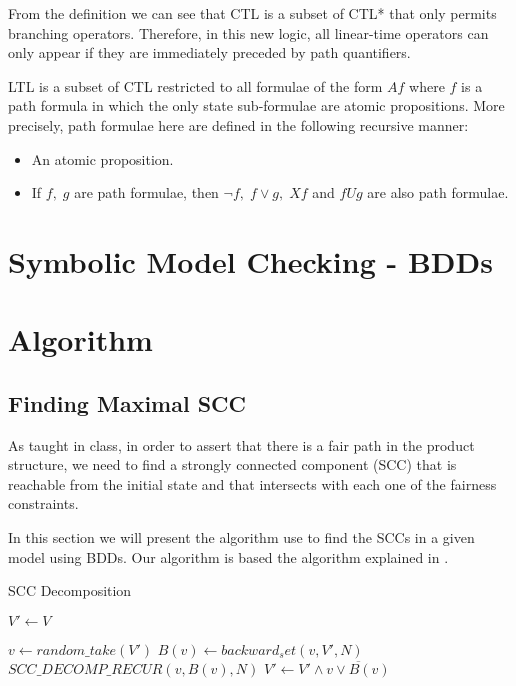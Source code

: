 \documentclass[11pt]{article}
\begin{document}
    From the definition we can see that CTL is a subset of CTL* that only permits
    branching operators. Therefore, in this new logic, all linear-time operators
    can only appear if they are immediately preceded by path quantifiers.

    \begin{definition}
        LTL is a subset of CTL restricted to all formulae of the form $Af$ where
        $f$ is a path formula in which the only state sub-formulae are atomic
        propositions\cite{ltl}.
        More precisely, path formulae here are defined in the following recursive
        manner:
        \begin{itemize}
            \item
                An atomic proposition.
            \item
                If $f,\; g$ are path formulae, then $\neg f,\; f\vee g,\;
                Xf$ and $fUg$ are also path formulae.
        \end{itemize}
    \end{definition}


\section{Symbolic Model Checking - BDDs}

\section{Algorithm}
    \subsection{Finding Maximal SCC}
        As taught in class, in order to assert that there is a fair path in the 
        product structure, we need to find a strongly connected component (SCC)
        that is reachable from the initial state and that intersects with
        each one of the fairness constraints.
        
        In this section we will present the algorithm use to find the SCCs in
        a given model using BDDs. Our algorithm is based the algorithm explained
        in \cite{scc}.

        \begin{algorithm}
            \caption{SCC Decomposition}\label{scc}
                \State $V' \gets V$

                    \State $v \gets random\_take(V')$
                    \State $B(v) \gets backward_set(v, V', N)$
                    \State $SCC\_DECOMP\_RECUR(v, B(v), N)$
                    \State $V' \gets V' \wedge \overline{v \vee B(v)}$
                \EndWhile
            \EndProcedure
        \end{algorithm}
\end{document}
